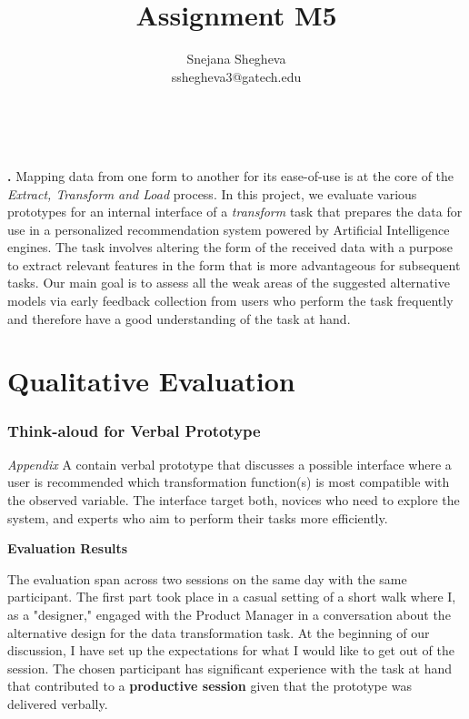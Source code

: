 \documentclass[12pt,letterpaper]{article}
\makeatletter
\renewcommand{\maketitle}{\bgroup
   \begin{center}
   \textbf{{\fontsize{18pt}{20}\selectfont \@title}}\\
   \vspace{10pt}
   {\fontsize{12pt}{0}\selectfont \@author} 
   \end{center}
}
\newenvironment{myquote}[1]%
  {\list{}{\leftmargin=#1\rightmargin=#1}\item[]}%
  {\endlist}
\renewenvironment{abstract}
{\vspace*{-.5in}\fontsize{12pt}{12}\begin{myquote}{.5in}
\noindent \par{\bfseries \abstractname.}}
{\medskip\noindent
\end{myquote}
}
\makeatother
\begin{document}
\title{Assignment M5}
\author{Snejana Shegheva \\ sshegheva3@gatech.edu}

\maketitle
\thispagestyle{fancy}

\begin{abstract}
Mapping data from one form to another for its ease-of-use is at the core of the \textit{Extract, Transform and Load} process. In this project, we evaluate various prototypes for an internal interface of a \textit{transform} task that prepares the data for use in a personalized recommendation system powered by Artificial Intelligence engines. The task involves altering the form of the received data with a purpose to extract relevant features in the form that is more advantageous for subsequent tasks. Our main goal is to assess all the weak areas of the suggested alternative models via early feedback collection from users who perform the task frequently and therefore have a good understanding of the task at hand.  
\end{abstract}

\section*{Qualitative Evaluation}
\subsubsection*{Think-aloud for Verbal Prototype}
\textit{Appendix} A contain verbal prototype that discusses a possible interface where a user is recommended which transformation function(s) is most compatible with the observed variable. The interface target both, novices who need to explore the system, and experts who aim to perform their tasks more efficiently.

\textbf{Evaluation Results}

The evaluation span across two sessions on the same day with the same participant. The first part took place in a casual setting of a short walk where I, as a "designer," engaged with the Product Manager in a conversation about the alternative design for the data transformation task. At the beginning of our discussion, I have set up the expectations for what I would like to get out of the session. The chosen participant has significant experience with the task at hand that contributed to a \textbf{productive session} given that the prototype was delivered verbally.
\end{document}
